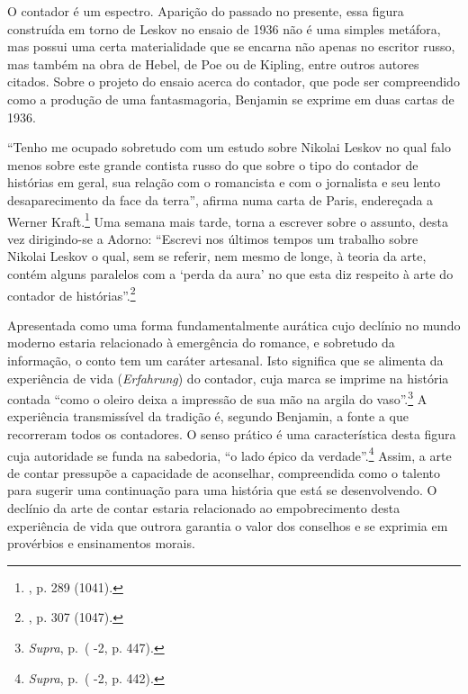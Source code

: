 O contador é um espectro. Aparição do passado no presente, essa figura
construída em torno de Leskov no ensaio de 1936 não é uma simples
metáfora, mas possui uma certa materialidade que se encarna não apenas
no escritor russo, mas também na obra de Hebel, de Poe ou de Kipling,
entre outros autores citados. Sobre o projeto do ensaio acerca do
contador, que pode ser compreendido como a produção de uma
fantasmagoria, Benjamin se exprime em duas cartas de 1936.

``Tenho me ocupado sobretudo com um estudo sobre Nikolai Leskov no qual
falo menos sobre este grande contista russo do que sobre o tipo do
contador de histórias em geral, sua relação com o romancista e com o
jornalista e seu lento desaparecimento da face da terra'', afirma numa
carta de Paris, endereçada a Werner Kraft.\footnote{ , p. 289 (1041).}
Uma semana mais tarde, torna a escrever sobre o assunto, desta vez
dirigindo-se a Adorno: ``Escrevi nos últimos tempos um trabalho sobre
Nikolai Leskov o qual, sem se referir, nem mesmo de longe, à teoria da
arte, contém alguns paralelos com a `perda da aura' no que esta diz
respeito à arte do contador de histórias''.\footnote{ , p. 307
  (1047).}

Apresentada como uma forma fundamentalmente aurática cujo declínio no
mundo moderno estaria relacionado à emergência do romance, e sobretudo
da informação, o conto tem um caráter artesanal. Isto significa que se
alimenta da experiência de vida (\emph{Erfahrung}) do contador, cuja
marca se imprime na história contada ``como o oleiro deixa a impressão
de sua mão na argila do vaso''.\footnote{\emph{Supra}, p.\,\pageref{supra} ( -2, p.
  447).} A experiência transmissível da tradição é, segundo Benjamin, a
fonte a que recorreram todos os contadores. O senso prático é uma
característica desta figura cuja autoridade se funda na sabedoria, ``o
lado épico da verdade''.\footnote{\emph{Supra}, p.\,\pageref{supra2} ( -2, p. 442).}
Assim, a arte de contar pressupõe a capacidade de aconselhar,
compreendida como o talento para sugerir uma continuação para uma
história que está se desenvolvendo. O declínio da arte de contar estaria
relacionado ao empobrecimento desta experiência de vida que outrora
garantia o valor dos conselhos e se exprimia em provérbios e
ensinamentos morais.


